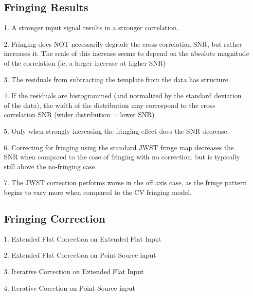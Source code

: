 \subsection{Fringing Results}
1. A stronger input signal results in a stronger correlation.

2. Fringing does NOT necessarily degrade the cross correlation SNR, but rather increases it. The scale of this increase seems to depend on the absolute magnitude of the correlation (ie, a larger increase at higher SNR)

3. The residuals from subtracting the template from the data has structure.

4. If the residuals are histogrammed (and normalized by the standard deviation of the data), the width of the distribution may correspond to the cross correlation SNR (wider distribution = lower SNR)

5. Only when strongly increasing the fringing effect does the SNR decrease.

6. Correcting for fringing using the standard JWST fringe map decreases the SNR when compared to the case of fringing with no correction, but is typically still above the no-fringing case.

7. The JWST correction performs worse in the off axis case, as the fringe pattern begins to vary more when compared to the CV fringing model.

\subsection{Fringing Correction}
1. Extended Flat Correction on Extended Flat Input

2. Extended Flat Correction on Point Source input

3. Iterative Correction on Extended Flat Input

4. Iterative Corretion on Point Source input

